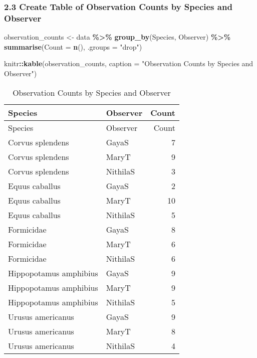 \documentclass[
]{article}
\newenvironment{Shaded}{\begin{snugshade}}{\end{snugshade}}
\newcommand{\AttributeTok}[1]{\textcolor[rgb]{0.13,0.29,0.53}{#1}}
\newcommand{\FunctionTok}[1]{\textcolor[rgb]{0.13,0.29,0.53}{\textbf{#1}}}
\newcommand{\NormalTok}[1]{#1}
\newcommand{\OtherTok}[1]{\textcolor[rgb]{0.56,0.35,0.01}{#1}}
\newcommand{\SpecialCharTok}[1]{\textcolor[rgb]{0.81,0.36,0.00}{\textbf{#1}}}
\newcommand{\StringTok}[1]{\textcolor[rgb]{0.31,0.60,0.02}{#1}}
\begin{document}
\subsubsection{2.3 Create Table of Observation Counts by Species and
Observer}\label{create-table-of-observation-counts-by-species-and-observer}

\begin{Shaded}
\begin{Highlighting}[]
\NormalTok{observation\_counts }\OtherTok{\textless{}{-}}\NormalTok{ data }\SpecialCharTok{\%\textgreater{}\%} 
  \FunctionTok{group\_by}\NormalTok{(Species, Observer) }\SpecialCharTok{\%\textgreater{}\%} 
  \FunctionTok{summarise}\NormalTok{(}\AttributeTok{Count =} \FunctionTok{n}\NormalTok{(), }\AttributeTok{.groups =} \StringTok{"drop"}\NormalTok{)}

\NormalTok{knitr}\SpecialCharTok{::}\FunctionTok{kable}\NormalTok{(observation\_counts, }\AttributeTok{caption =} \StringTok{"Observation Counts by Species and Observer"}\NormalTok{)}
\end{Highlighting}
\end{Shaded}

\begin{longtable}[]{@{}llr@{}}
\caption{Observation Counts by Species and Observer}\tabularnewline
\toprule\noalign{}
Species & Observer & Count \\
\midrule\noalign{}
\endfirsthead
\toprule\noalign{}
Species & Observer & Count \\
\midrule\noalign{}
\endhead
\bottomrule\noalign{}
\endlastfoot
Corvus splendens & GayaS & 7 \\
Corvus splendens & MaryT & 9 \\
Corvus splendens & NithilaS & 3 \\
Equus caballus & GayaS & 2 \\
Equus caballus & MaryT & 10 \\
Equus caballus & NithilaS & 5 \\
Formicidae & GayaS & 8 \\
Formicidae & MaryT & 6 \\
Formicidae & NithilaS & 6 \\
Hippopotamus amphibius & GayaS & 9 \\
Hippopotamus amphibius & MaryT & 9 \\
Hippopotamus amphibius & NithilaS & 5 \\
Urusus americanus & GayaS & 9 \\
Urusus americanus & MaryT & 8 \\
Urusus americanus & NithilaS & 4 \\
\end{longtable}
\end{document}

